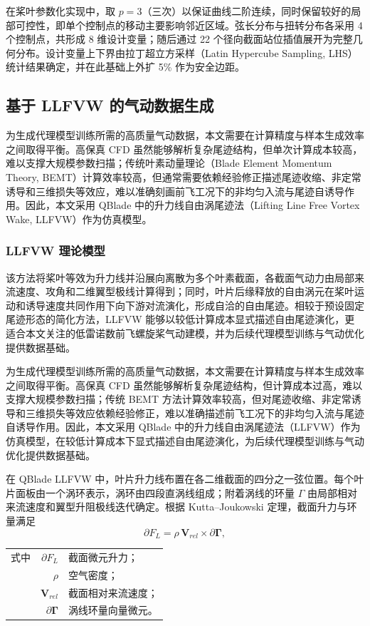 在桨叶参数化实现中，取 $p=3$（三次）以保证曲线二阶连续，同时保留较好的局部可控性，即单个控制点的移动主要影响邻近区域。弦长分布与扭转分布各采用 4 个控制点，共形成 8 维设计变量；随后通过 22 个径向截面站位插值展开为完整几何分布。设计变量上下界由拉丁超立方采样（Latin Hypercube Sampling, LHS）统计结果确定，并在此基础上外扩 5\% 作为安全边距。

\subsection{基于 LLFVW 的气动数据生成}

为生成代理模型训练所需的高质量气动数据，本文需要在计算精度与样本生成效率之间取得平衡。高保真 CFD 虽然能够解析复杂尾迹结构，但单次计算成本较高，难以支撑大规模参数扫描；传统叶素动量理论（Blade Element Momentum Theory, BEMT）计算效率较高，但通常需要依赖经验修正描述尾迹收缩、非定常诱导和三维损失等效应，难以准确刻画前飞工况下的非均匀入流与尾迹自诱导作用。因此，本文采用 QBlade 中的升力线自由涡尾迹法（Lifting Line Free Vortex Wake, LLFVW）作为仿真模型。

\subsubsection{LLFVW 理论模型}

该方法将桨叶等效为升力线并沿展向离散为多个叶素截面，各截面气动力由局部来流速度、攻角和二维翼型极线计算得到；同时，叶片后缘释放的自由涡元在桨叶运动和诱导速度共同作用下向下游对流演化，形成自洽的自由尾迹。相较于预设固定尾迹形态的简化方法，LLFVW 能够以较低计算成本显式描述自由尾迹演化，更适合本文关注的低雷诺数前飞螺旋桨气动建模，并为后续代理模型训练与气动优化提供数据基础。


为生成代理模型训练所需的高质量气动数据，本文需要在计算精度与样本生成效率之间取得平衡。高保真 CFD 虽然能够解析复杂尾迹结构，但计算成本过高，难以支撑大规模参数扫描；传统 BEMT 方法计算效率较高，但对尾迹收缩、非定常诱导和三维损失等效应依赖经验修正，难以准确描述前飞工况下的非均匀入流与尾迹自诱导作用。因此，本文采用 QBlade 中的升力线自由涡尾迹法（LLFVW）作为仿真模型，在较低计算成本下显式描述自由尾迹演化，为后续代理模型训练与气动优化提供数据基础。


在 QBlade LLFVW 中，叶片升力线布置在各二维截面的四分之一弦位置。每个叶片面板由一个涡环表示，涡环由四段直涡线组成；附着涡线的环量 $\Gamma$ 由局部相对来流速度和翼型升阻极线迭代确定。根据 Kutta--Joukowski 定理，截面升力与环量满足
\begin{equation}
\partial F_L = \rho\,\mathbf{V}_{rel}\times\partial\boldsymbol{\Gamma},
\end{equation}
\noindent
\begin{tabularx}{\textwidth}{@{}l@{\quad}r@{———}X@{}}
式中 & $\partial F_L$                 & 截面微元升力；\\
     & $\rho$                         & 空气密度；\\
     & $\mathbf{V}_{rel}$             & 截面相对来流速度；\\
     & $\partial\boldsymbol{\Gamma}$  & 涡线环量向量微元。\\
\end{tabularx}\vspace{3.15bp}

